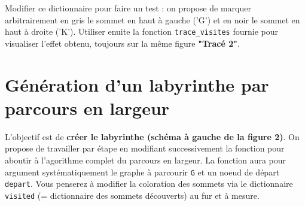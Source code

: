 \begin{question}
Modifier ce dictionnaire pour faire un test : on propose de marquer arbitrairement en gris le sommet en haut à gauche ('G') et en noir le sommet en haut à droite ('K'). Utiliser enuite la fonction \texttt{trace\_visites} fournie pour visualiser l'effet obtenu, toujours sur la même figure \textbf{"Tracé 2"}. 
\end{question}








\section*{Génération d'un labyrinthe par parcours en largeur}

L'objectif est de \textbf{créer le labyrinthe (schéma à gauche de la figure 2)}.
On propose de travailler par étape en modifiant successivement la fonction pour aboutir à l'agorithme complet du parcours en largeur.
La fonction aura pour argument systématiquement le graphe à parcourir \texttt{G} et un noeud de départ \texttt{depart}. Vous penserez à modifier la coloration des sommets via le dictionnaire \texttt{visited} (= dictionnaire des sommets découverts) au fur et à mesure.

